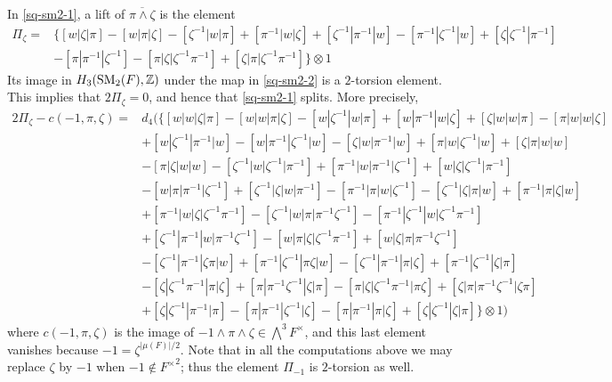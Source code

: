 \documentclass[11pt]{amsart}
\theoremstyle{definition}
\theoremstyle{plain}
\theoremstyle{definition}
\numberwithin{equation}{section}
\newcommand{\z}{\mathbb{Z}}
\newcommand{\SM}{\mathit{{\rm SM}}}
\begin{document}
	In \eqref{sq-sm2-1}, a lift of $\overline{\pi\wedge\zeta}$ is the element
	\begin{align*}
		\Pi_{\zeta}=&\bigg\{[w|\zeta|\pi]-[w|\pi|\zeta]-[\zeta^{-1}|w|\pi]+[\pi^{-1}|w|\zeta]+[\zeta^{-1}|\pi^{-1}|w]-[\pi^{-1}|\zeta^{-1}|w]+[\zeta|\zeta^{-1}|\pi^{-1}]\\
		&-[\pi|\pi^{-1}|\zeta^{-1}]-[\pi|\zeta|\zeta^{-1}\pi^{-1}]+[\zeta|\pi|\zeta^{-1}\pi^{-1}]\bigg\}\otimes 1
	\end{align*}
	Its image in $H_3(\SM_2(F),\z)$ under the map in \eqref{sq-sm2-2} is a $2$-torsion element. This implies that $2\Pi_{\zeta}=0$, and hence that \eqref{sq-sm2-1} splits. More precisely,
	\begin{align*}
		2\Pi_{\zeta}-c(-1,\pi,\zeta)=&d_4\big(\{[w|w|\zeta|\pi]-[w|w|\pi|\zeta]-[w|\zeta^{-1}|w|\pi]+[w|\pi^{-1}|w|\zeta]+[\zeta|w|w|\pi]-[\pi|w|w|\zeta]\\
		&+[w|\zeta^{-1}|\pi^{-1}|w]-[w|\pi^{-1}|\zeta^{-1}|w]-[\zeta|w|\pi^{-1}|w]+[\pi|w|\zeta^{-1}|w]+[\zeta|\pi|w|w]\\
		&-[\pi|\zeta|w|w]-[\zeta^{-1}|w|\zeta^{-1}|\pi^{-1}]+[\pi^{-1}|w|\pi^{-1}|\zeta^{-1}]+[w|\zeta|\zeta^{-1}|\pi^{-1}]\\
		&-[w|\pi|\pi^{-1}|\zeta^{-1}]+[\zeta^{-1}|\zeta|w|\pi^{-1}]-[\pi^{-1}|\pi|w|\zeta^{-1}]-[\zeta^{-1}|\zeta|\pi|w]+[\pi^{-1}|\pi|\zeta|w]\\
		&+[\pi^{-1}|w|\zeta|\zeta^{-1}\pi^{-1}]-[\zeta^{-1}|w|\pi|\pi^{-1}\zeta^{-1}]-[\pi^{-1}|\zeta^{-1}|w|\zeta^{-1}\pi^{-1}]\\
		&+[\zeta^{-1}|\pi^{-1}|w|\pi^{-1}\zeta^{-1}]-[w|\pi|\zeta|\zeta^{-1}\pi^{-1}]+[w|\zeta|\pi|\pi^{-1}\zeta^{-1}]\\
		&-[\zeta^{-1}|\pi^{-1}|\zeta\pi|w]+[\pi^{-1}|\zeta^{-1}|\pi\zeta|w]-[\zeta^{-1}|\pi^{-1}|\pi|\zeta]+[\pi^{-1}|\zeta^{-1}|\zeta|\pi]\\
		&-[\zeta|\zeta^{-1}\pi^{-1}|\pi|\zeta]+[\pi|\pi^{-1}\zeta^{-1}|\zeta|\pi]-[\pi|\zeta|\zeta^{-1}\pi^{-1}|\pi\zeta]+[\zeta|\pi|\pi^{-1}\zeta^{-1}|\zeta\pi]\\
		&+[\zeta|\zeta^{-1}|\pi^{-1}|\pi]-[\pi|\pi^{-1}|\zeta^{-1}|\zeta]-[\pi|\pi^{-1}|\pi|\zeta]+[\zeta|\zeta^{-1}|\zeta|\pi]\}\otimes 1\big)
	\end{align*}
	where $c(-1,\pi,\zeta)$ is the image of $-1\wedge\pi\wedge\zeta\in\bigwedge^3F^\times$, and this last element vanishes because $-1=\zeta^{|\mu(F)|/2}$. Note that in all the computations above we may replace $\zeta$ by $-1$ when $-1\notin{F^\times}^2$; thus the element $\Pi_{-1}$ is $2$-torsion as well.\\ 
\end{document}
